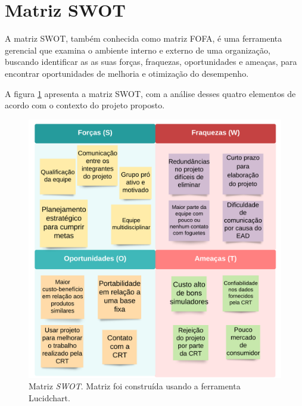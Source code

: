 \section{Matriz SWOT}

A matriz SWOT, também conhecida como matriz FOFA, é uma ferramenta gerencial que examina o ambiente interno e externo de uma organização, buscando identificar as as suas forças, fraquezas, oportunidades e ameaças, para encontrar oportunidades de melhoria e otimização do desempenho\cite{santella_MatrizSWOT_blog2020}.

A figura \ref{fig:matrizSWOT} apresenta a matriz SWOT, com a análise desses quatro elementos de acordo com o contexto do projeto proposto.

\begin{figure}[H]
  \centering
  \includegraphics[scale=0.15]{figuras/SWOT_BaseLancamento.png}
  \caption{Matriz \textit{SWOT}. Matriz foi construída usando a ferramenta Lucidchart.} 
  \label{fig:matrizSWOT}
\end{figure}